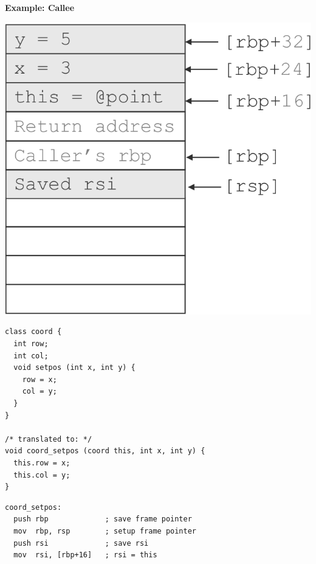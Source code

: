 \documentclass[twocolumn,english]{article}
\begin{document}
\begin{table}[H]
\textbf{Example: Callee}

\noindent \begin{centering}
\includegraphics[scale=0.15]{img/stack}
\par\end{centering}

\noindent \begin{minipage}[t]{0.2\textwidth}
\begin{lstlisting}[basicstyle={\scriptsize\ttfamily},breaklines=true,keywords={loop, exit, when, end}]
class coord {
  int row;
  int col;
  void setpos (int x, int y) {
    row = x;
    col = y;
  }
}

/* translated to: */
void coord_setpos (coord this, int x, int y) {
  this.row = x;
  this.col = y;
}
\end{lstlisting}


\noindent \end{minipage}
\begin{minipage}[t]{0.3\textwidth}

\noindent \begin{centering}
\begin{lstlisting}[basicstyle={\scriptsize\ttfamily},breaklines=true,keywords={loop, exit, when, end}]
coord_setpos:
  push rbp             ; save frame pointer
  mov  rbp, rsp        ; setup frame pointer
  push rsi             ; save rsi
  mov  rsi, [rbp+16]   ; rsi = this
  

\end{lstlisting}
\end{centering}
\end{minipage}
\end{table}
\end{document}
